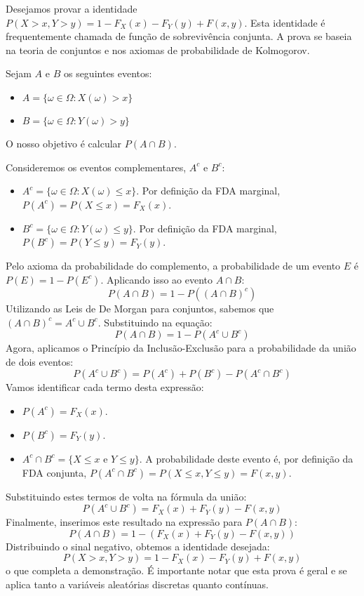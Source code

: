 \documentclass[
]{article}
\begin{document}
Desejamos provar a identidade \(P(X>x, Y>y)= 1-F_X(x)-F_Y(y)+F(x,y)\).
Esta identidade é frequentemente chamada de função de sobrevivência
conjunta. A prova se baseia na teoria de conjuntos e nos axiomas de
probabilidade de Kolmogorov.

Sejam \(A\) e \(B\) os seguintes eventos:

\begin{itemize}
    \item $A = \{ \omega \in \Omega : X(\omega) > x \}$
    \item $B = \{ \omega \in \Omega : Y(\omega) > y \}$
\end{itemize}

O nosso objetivo é calcular \(P(A \cap B)\).

Consideremos os eventos complementares, \(A^c\) e \(B^c\):

\begin{itemize}
    \item $A^c = \{ \omega \in \Omega : X(\omega) \le x \}$. Por definição da FDA marginal, $P(A^c) = P(X \le x) = F_X(x)$.
    \item $B^c = \{ \omega \in \Omega : Y(\omega) \le y \}$. Por definição da FDA marginal, $P(B^c) = P(Y \le y) = F_Y(y)$.
\end{itemize}

Pelo axioma da probabilidade do complemento, a probabilidade de um
evento \(E\) é \(P(E) = 1 - P(E^c)\). Aplicando isso ao evento
\(A \cap B\): \[ P(A \cap B) = 1 - P((A \cap B)^c) \] Utilizando as Leis
de De Morgan para conjuntos, sabemos que
\((A \cap B)^c = A^c \cup B^c\). Substituindo na equação:
\[ P(A \cap B) = 1 - P(A^c \cup B^c) \] Agora, aplicamos o Princípio da
Inclusão-Exclusão para a probabilidade da união de dois eventos:
\[ P(A^c \cup B^c) = P(A^c) + P(B^c) - P(A^c \cap B^c) \] Vamos
identificar cada termo desta expressão:

\begin{itemize}
    \item $P(A^c) = F_X(x)$.
    \item $P(B^c) = F_Y(y)$.
    \item $A^c \cap B^c = \{X \le x \text{ e } Y \le y\}$. A probabilidade deste evento é, por definição da FDA conjunta, $P(A^c \cap B^c) = P(X \le x, Y \le y) = F(x,y)$.
\end{itemize}

Substituindo estes termos de volta na fórmula da união:
\[ P(A^c \cup B^c) = F_X(x) + F_Y(y) - F(x,y) \] Finalmente, inserimos
este resultado na expressão para \(P(A \cap B)\):
\[ P(A \cap B) = 1 - \left( F_X(x) + F_Y(y) - F(x,y) \right) \]
Distribuindo o sinal negativo, obtemos a identidade desejada:
\[ P(X>x, Y>y) = 1 - F_X(x) - F_Y(y) + F(x,y) \] o que completa a
demonstração. É importante notar que esta prova é geral e se aplica
tanto a variáveis aleatórias discretas quanto contínuas.
\end{document}

